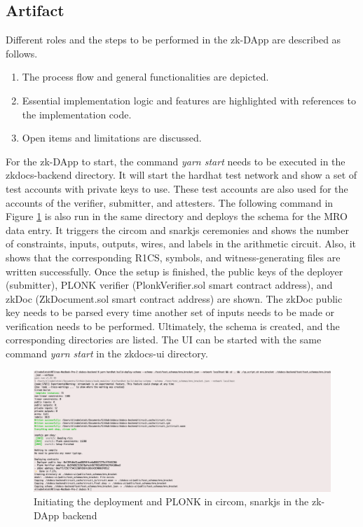 \subsection{Artifact}
Different roles and the steps to be performed in the zk-DApp are described as follows.
\begin{enumerate}
\item The process flow and general functionalities are depicted.
\item Essential implementation logic and features are highlighted with references to the implementation code.
\item Open items and limitations are discussed.
\end{enumerate}
For the zk-DApp to start, the command \textit{yarn start} needs to be executed in the zkdocs-backend directory. It will start the hardhat test network and show a set of test accounts with private keys to use. These test accounts are also used for the accounts of the verifier, submitter, and attesters. The following command in Figure \ref{fig:second-cmd} is also run in the same directory and deploys the schema for the MRO data entry. It triggers the circom and snarkjs ceremonies and shows the number of constraints, inputs, outputs, wires, and labels in the arithmetic circuit. Also, it shows that the corresponding R1CS, symbols, and witness-generating files are written successfully. Once the setup is finished, the public keys of the deployer (submitter), PLONK verifier (PlonkVerifier.sol smart contract address), and zkDoc (ZkDocument.sol smart contract address) are shown. The zkDoc public key needs to be parsed every time another set of inputs needs to be made or verification needs to be performed. Ultimately, the schema is created, and the corresponding directories are listed. The UI can be started with the same command \textit{yarn start} in the zkdocs-ui directory.

\begin{figure}[hbt]
	\centering
		\includegraphics[width=1.0\textwidth]{Pictures/second-cmd.png}
	\caption{Initiating the deployment and PLONK in circom, snarkjs in the zk-DApp backend}
	\label{fig:second-cmd}
\end{figure}

